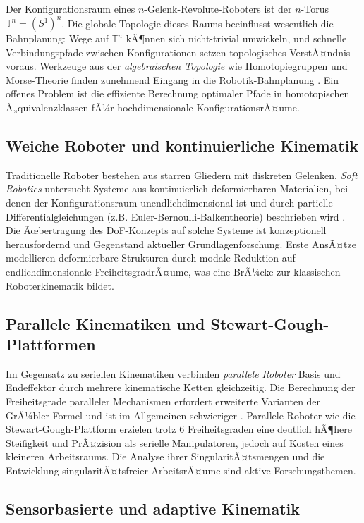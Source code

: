 ﻿\documentclass[a4paper,12pt]{article}
\theoremstyle{definition}
\begin{document}
Der Konfigurationsraum eines $n$-Gelenk-Revolute-Roboters ist der $n$-Torus $\mathbb{T}^n = (S^1)^n$. Die globale Topologie dieses Raums beeinflusst wesentlich die Bahnplanung: Wege auf $\mathbb{T}^n$ kÃ¶nnen sich nicht-trivial umwickeln, und schnelle Verbindungspfade zwischen Konfigurationen setzen topologisches VerstÃ¤ndnis voraus. Werkzeuge aus der \emph{algebraischen Topologie} wie Homotopiegruppen und Morse-Theorie finden zunehmend Eingang in die Robotik-Bahnplanung \cite{lavalle2006planning}. Ein offenes Problem ist die effiziente Berechnung optimaler Pfade in homotopischen Ã„quivalenzklassen fÃ¼r hochdimensionale KonfigurationsrÃ¤ume.

\subsection{Weiche Roboter und kontinuierliche Kinematik}

Traditionelle Roboter bestehen aus starren Gliedern mit diskreten Gelenken. \emph{Soft Robotics} untersucht Systeme aus kontinuierlich deformierbaren Materialien, bei denen der Konfigurationsraum unendlichdimensional ist und durch partielle Differentialgleichungen (z.B. Euler-Bernoulli-Balkentheorie) beschrieben wird \cite{rus2015design}. Die Ãœbertragung des DoF-Konzepts auf solche Systeme ist konzeptionell herausfordernd und Gegenstand aktueller Grundlagenforschung. Erste AnsÃ¤tze modellieren deformierbare Strukturen durch modale Reduktion auf endlichdimensionale FreiheitsgradrÃ¤ume, was eine BrÃ¼cke zur klassischen Roboterkinematik bildet.

\subsection{Parallele Kinematiken und Stewart-Gough-Plattformen}

Im Gegensatz zu seriellen Kinematiken verbinden \emph{parallele Roboter} Basis und Endeffektor durch mehrere kinematische Ketten gleichzeitig. Die Berechnung der Freiheitsgrade paralleler Mechanismen erfordert erweiterte Varianten der GrÃ¼bler-Formel und ist im Allgemeinen schwieriger \cite{merlet2006parallel}. Parallele Roboter wie die Stewart-Gough-Plattform erzielen trotz 6 Freiheitsgraden eine deutlich hÃ¶here Steifigkeit und PrÃ¤zision als serielle Manipulatoren, jedoch auf Kosten eines kleineren Arbeitsraums. Die Analyse ihrer SingularitÃ¤tsmengen und die Entwicklung singularitÃ¤tsfreier ArbeitsrÃ¤ume sind aktive Forschungsthemen.

\subsection{Sensorbasierte und adaptive Kinematik}
\end{document}
